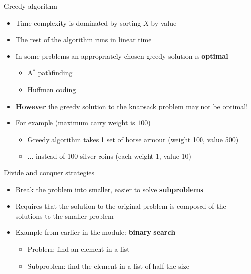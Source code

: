 \begin{frame}{Greedy algorithm}
	\begin{itemize}
		\pause\item Time complexity is dominated by sorting $X$ by value
		\pause\item The rest of the algorithm runs in linear time
		\pause\item In some problems an appropriately chosen greedy solution is \textbf{optimal}
			\begin{itemize}
				\pause\item A$^*$ pathfinding
				\pause\item Huffman coding
			\end{itemize}
		\pause\item \textbf{However} the greedy solution to the knapsack problem may not be optimal!
		\pause\item For example (maximum carry weight is $100$)
		\begin{itemize}
			\pause\item Greedy algorithm takes 1 set of horse armour (weight 100, value 500)
			\pause\item ... instead of 100 silver coins (each weight 1, value 10)
		\end{itemize}
	\end{itemize}
\end{frame}

\begin{frame}{Divide and conquer strategies}
	\begin{itemize}
		\pause\item Break the problem into smaller, easier to solve \textbf{subproblems}
		\pause\item Requires that the solution to the original problem is composed of the solutions to the smaller problem
		\pause\item Example from earlier in the module: \textbf{binary search}
			\begin{itemize}
				\pause\item Problem: find an element in a list
				\pause\item Subproblem: find the element in a list of half the size
			\end{itemize}
	\end{itemize}
\end{frame}

